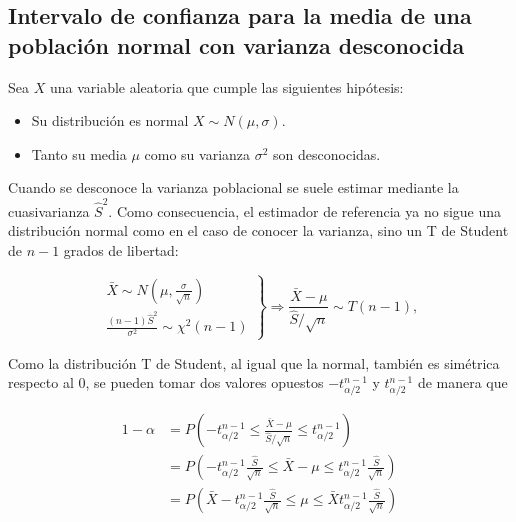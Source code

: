 \documentclass[
  a4paper,
]{scrreport}
\providecommand{\tightlist}{%
  \setlength{\itemsep}{0pt}\setlength{\parskip}{0pt}}\usepackage{longtable,booktabs,array}
\theoremstyle{definition}
\theoremstyle{definition}
\theoremstyle{plain}
\theoremstyle{remark}
\begin{document}
\hypertarget{intervalo-de-confianza-para-la-media-de-una-poblaciuxf3n-normal-con-varianza-desconocida}{%
\subsection{Intervalo de confianza para la media de una población normal
con varianza
desconocida}\label{intervalo-de-confianza-para-la-media-de-una-poblaciuxf3n-normal-con-varianza-desconocida}}

Sea \(X\) una variable aleatoria que cumple las siguientes hipótesis:

\begin{itemize}
\tightlist
\item
  Su distribución es normal \(X\sim N(\mu,\sigma)\).
\item
  Tanto su media \(\mu\) como su varianza \(\sigma^2\) son desconocidas.
\end{itemize}

Cuando se desconoce la varianza poblacional se suele estimar mediante la
cuasivarianza \(\hat{S}^2\). Como consecuencia, el estimador de
referencia ya no sigue una distribución normal como en el caso de
conocer la varianza, sino un T de Student de \(n-1\) grados de libertad:

\[
\left.
\begin{array}{l}
\bar X \sim N\left(\mu,\frac{\sigma}{\sqrt{n}}\right)\\
\displaystyle\frac{(n-1)\hat{S}^2}{\sigma^2}\sim \chi^2(n-1)
\end{array}
\right\}
\Rightarrow
\frac{\bar X -\mu}{\hat{S}/\sqrt{n}}\sim T(n-1),
\]

Como la distribución T de Student, al igual que la normal, también es
simétrica respecto al 0, se pueden tomar dos valores opuestos
\(-t^{n-1}_{\alpha/2}\) y \(t^{n-1}_{\alpha/2}\) de manera que

\begin{align*}
1-\alpha 
&= P\left(-t^{n-1}_{\alpha/2}\leq \frac{\bar X -\mu}{\hat{S}/\sqrt{n}} \leq t^{n-1}_{\alpha/2}\right)\\
&= P\left(-t^{n-1}_{\alpha/2}\frac{\hat{S}}{\sqrt{n}}\leq \bar X -\mu \leq t^{n-1}_{\alpha/2}\frac{\hat{S}}{\sqrt{n}}\right)\\
&= P\left(\bar X-t^{n-1}_{\alpha/2}\frac{\hat{S}}{\sqrt{n}}\leq \mu \leq \bar X t^{n-1}_{\alpha/2}\frac{\hat{S}}{\sqrt{n}}\right)
\end{align*}
\end{document}
